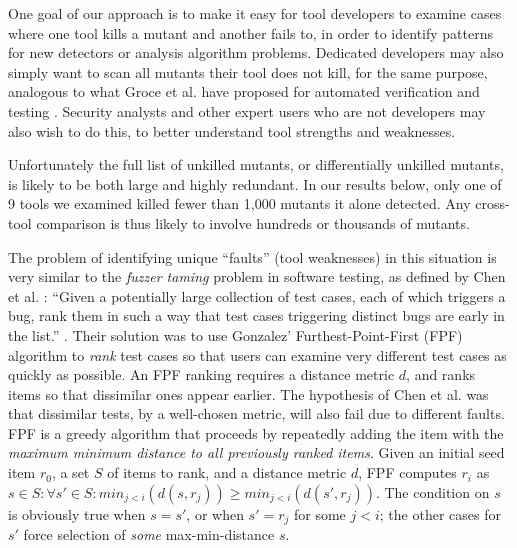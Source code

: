 One goal of our approach is to make it easy for tool developers to examine cases where one tool kills a mutant and another fails to, in order to identify patterns for new detectors or analysis algorithm problems.  Dedicated developers may also simply want to scan all mutants their tool does not kill, for the same purpose, analogous to what Groce et al. have proposed for automated verification and testing \cite{groce2015verified,groce2018verified}.  Security analysts and other expert users who are not developers may also wish to do this, to better understand tool strengths and weaknesses.

Unfortunately the full list of unkilled mutants, or differentially
unkilled mutants, is likely to be both large and highly redundant.  In
our results below, only one of 9 tools we examined killed fewer than
1,000 mutants it alone detected.  Any cross-tool comparison is thus
likely to involve hundreds or thousands of mutants.

The problem of identifying unique ``faults'' (tool weaknesses) in this
situation is very similar to the \emph{fuzzer taming} problem in
software testing, as defined by Chen et al. \cite{PLDI13}: ``Given a
potentially large collection of test cases, each of which triggers a
bug, rank them in such a way that test cases triggering distinct bugs
are early in the list.'' \cite{PLDI13}.  Their solution was
to use Gonzalez' Furthest-Point-First \cite{Gonzalez} (FPF) algorithm
to \emph{rank} test cases so that users can examine very different
test cases as quickly as possible.  An
FPF ranking requires a distance metric $d$, and ranks items so that
dissimilar ones appear earlier.
The hypothesis of Chen et al. was that dissimilar tests, by a
well-chosen metric, will also fail due to different faults.  FPF is a
greedy algorithm that proceeds by repeatedly adding the item with the
\emph{maximum minimum distance to all previously ranked items}. Given an
initial seed item $r_0$, a set $S$ of items to rank, and a distance
metric $d$, FPF computes $r_i$ as
$s \in S: \forall s' \in S: min_{ j < i}(d(s,r_j)) \geq min_{j <
  i}(d(s',r_j))$.  The condition on $s$ is obviously true when
$s = s'$, or when $s' = r_j$ for some $j < i$; the other cases for
$s'$ force selection of \emph{some}
max-min-distance $s$.

